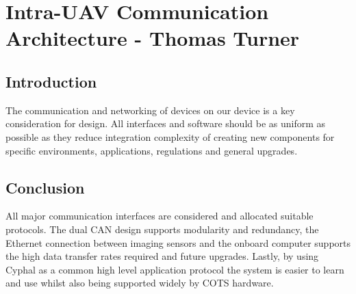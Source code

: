 \newpage
{}
\section{Intra-UAV Communication Architecture - Thomas Turner} \label{Intra Communication}

\subsection{Introduction}\label{sub_section:tgt_intra_com_intro}
The communication and networking of devices on our device is a key consideration for design. All interfaces and software should be as uniform as possible as they reduce integration complexity of creating new components for specific environments, applications, regulations and general upgrades.



\subsection{Conclusion}
All major communication interfaces are considered and allocated suitable protocols. The dual \gls{CAN} design supports modularity and redundancy, the Ethernet connection between imaging sensors and the onboard computer supports the high data transfer rates required and future upgrades. Lastly, by using Cyphal as a common high level application protocol the system is easier to learn and use whilst also being supported widely by \gls{COTS} hardware.
